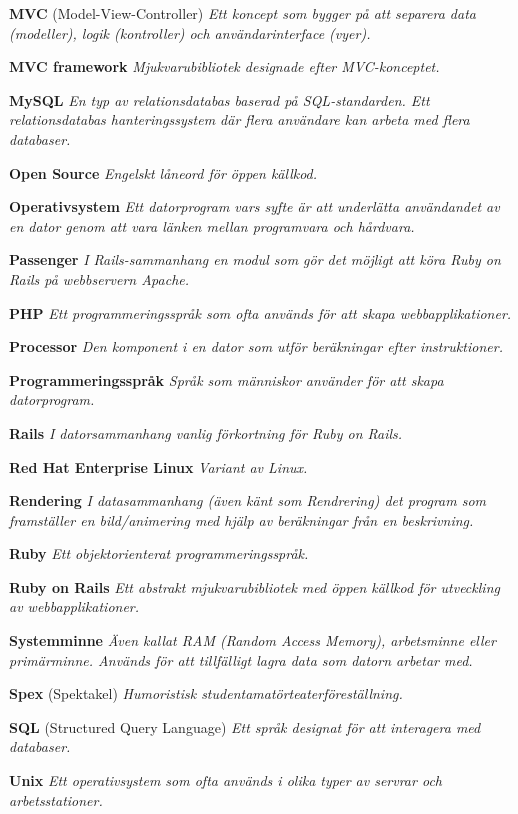 \documentclass[a4paper, twoside, 11pt, titlepage]{article}
\begin{document}
	\textbf{MVC} (Model-View-Controller) \emph{Ett koncept som bygger på att separera data (modeller), logik (kontroller) och användarinterface (vyer).}

	\textbf{MVC framework} \emph{Mjukvarubibliotek designade efter MVC-konceptet.}

	\textbf{MySQL} \emph{En typ av relationsdatabas baserad på SQL-standarden. Ett relationsdatabas hanteringssystem där flera användare kan arbeta med flera databaser.}

	\textbf{Open Source} \emph{Engelskt låneord för öppen källkod.}

	\textbf{Operativsystem} \emph{Ett datorprogram vars syfte är att underlätta användandet av en dator genom att vara länken mellan programvara och hårdvara.}

	\textbf{Passenger} \emph{I Rails-sammanhang en modul som gör det möjligt att köra Ruby on Rails på webbservern Apache.}

	\textbf{PHP} \emph{Ett programmeringsspråk som ofta används för att skapa webbapplikationer.}

	\textbf{Processor} \emph{Den komponent i en dator som utför beräkningar efter instruktioner.}

	\textbf{Programmeringsspråk} \emph{Språk som människor använder för att skapa datorprogram.}

	\textbf{Rails} \emph{I datorsammanhang vanlig förkortning för Ruby on Rails.}

	\textbf{Red Hat Enterprise Linux} \emph{Variant av Linux.}

	\textbf{Rendering} \emph{I datasammanhang (även känt som Rendrering) det program som framställer en bild/animering med hjälp av beräkningar från en beskrivning.}

	\textbf{Ruby} \emph{Ett objektorienterat programmeringsspråk.}

	\textbf{Ruby on Rails} \emph{Ett abstrakt mjukvarubibliotek med öppen källkod för utveckling av webbapplikationer.}

	\textbf{Systemminne} \emph{Även kallat RAM (Random Access Memory), arbetsminne eller primärminne. Används för att tillfälligt lagra data som datorn arbetar med.}

	\textbf{Spex} (Spektakel) \emph{Humoristisk studentamatörteaterföreställning.}

	\textbf{SQL} (Structured Query Language) \emph{Ett språk designat för att interagera med databaser.}

	\textbf{Unix} \emph{Ett operativsystem som ofta används i olika typer av servrar och arbetsstationer.}
\end{document}
